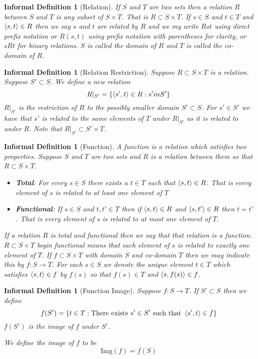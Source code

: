 \documentclass[12pt]{article}
\theoremstyle{break}
\theoremstyle{break}
\theoremstyle{break}
\theoremstyle{break}
\theoremstyle{break}
\newtheorem{informal definition}[definition]{Informal Definition}
\theoremstyle{break}
\newtheorem{informal theorem}[theorem]{Informal Theorem}
\begin{document}
\begin{informal definition}[Relation]
If $S$ and $T$ are two sets then a relation $R$ between $S$ and $T$ is any subset of $S\times T$.
That is $R \subset S \times T$.
If $s\in S$ and $t\in T$ and $\braket{s, t} \in R$ then we say $s$ and $t$ are related by $R$ and we my write $Rst$ using direct prefix notation or $R(s, t)$ using prefix notation with parentheses for clarity, or $sRt$ for binary relations.
$S$ is called the domain of $R$ and $T$ is called the co-domain of $R$.
\end{informal definition}

\begin{informal definition}[Relation Restriction]
Suppose $R\subset S \times T$ is a relation.
Suppose $S' \subset S$.
We define a new relation
$$
R|_{S'} = \{\braket{s', t} \in R: s' in S'\}
$$
$R|_{S'}$ is the restriction of $R$ to the possibly smaller domain $S' \subset S$.
For $s' \in S'$ we have that $s'$ is related to the same elements of $T$ under $R|_{S'}$ as it is related to under $R$.
Note that $R|_{S'} \subset S' \times T$.
\end{informal definition}

\begin{informal definition}[Function]
A function is a relation which satisfies two properties.
Suppose $S$ and $T$ are two sets and $R$ is a relation between them so that $R \subset S\times T$.
\begin{itemize}
\item{\textbf{Total}: For every $s\in S$ there exists a $t\in T$ such that $\braket{s, t} \in R$. That is every element of $s$ is related to at least one element of $T$}
\item{\textbf{Functional}: If $s\in S$ and $t, t' \in T$ then if $\braket{s, t} \in R$ and $\braket{s, t'} \in R$ then $t = t'$. That is every element of $s$ is related to at most one element of $T$.}
\end{itemize}
If a relation $R$ is total and functional then we say that that relation is a function.
$R \subset S \times T$ begin functional means that each element of $s$ is related to exactly one element of $T$.
If $f\subset S\times T$ with domain $S$ and co-domain $T$ then we may indicate this by $f: S \to T$.
For each $s\in S$ we denote the unique element $t\in T$ which satisfies $\braket{s, t} \in f$ by $f(s)$ so that $f(s)\in T$ and $\braket{s, f(s)} \in f$.
\end{informal definition}

\begin{informal definition}[Function Image]
Suppose $f: S\to T$.
If $S' \subset S$ then we define
$$
f(S') = \{t \in T: \text{There exists } s' \in S' \text{ such that } \braket{s', t} \in f\}
$$
$f(S')$ is the image of $f$ under $S'$.

We define the image of $f$ to be
$$
\text{Img}(f) = f(S)
$$
\end{informal definition}
\end{document}
